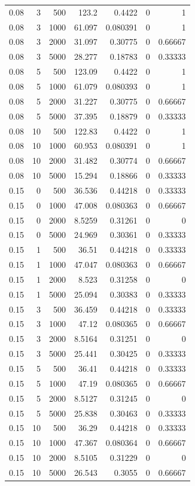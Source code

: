 \begin{tabular}{rrrrrrr}
0.08 & 3 & 500 & 123.2 & 0.4422 & 0 & 1 \\
0.08 & 3 & 1000 & 61.097 & 0.080391 & 0 & 1 \\
0.08 & 3 & 2000 & 31.097 & 0.30775 & 0 & 0.66667 \\
0.08 & 3 & 5000 & 28.277 & 0.18783 & 0 & 0.33333 \\
0.08 & 5 & 500 & 123.09 & 0.4422 & 0 & 1 \\
0.08 & 5 & 1000 & 61.079 & 0.080393 & 0 & 1 \\
0.08 & 5 & 2000 & 31.227 & 0.30775 & 0 & 0.66667 \\
0.08 & 5 & 5000 & 37.395 & 0.18879 & 0 & 0.33333 \\
0.08 & 10 & 500 & 122.83 & 0.4422 & 0 & 1 \\
0.08 & 10 & 1000 & 60.953 & 0.080391 & 0 & 1 \\
0.08 & 10 & 2000 & 31.482 & 0.30774 & 0 & 0.66667 \\
0.08 & 10 & 5000 & 15.294 & 0.18866 & 0 & 0.33333 \\
0.15 & 0 & 500 & 36.536 & 0.44218 & 0 & 0.33333 \\
0.15 & 0 & 1000 & 47.008 & 0.080363 & 0 & 0.66667 \\
0.15 & 0 & 2000 & 8.5259 & 0.31261 & 0 & 0 \\
0.15 & 0 & 5000 & 24.969 & 0.30361 & 0 & 0.33333 \\
0.15 & 1 & 500 & 36.51 & 0.44218 & 0 & 0.33333 \\
0.15 & 1 & 1000 & 47.047 & 0.080363 & 0 & 0.66667 \\
0.15 & 1 & 2000 & 8.523 & 0.31258 & 0 & 0 \\
0.15 & 1 & 5000 & 25.094 & 0.30383 & 0 & 0.33333 \\
0.15 & 3 & 500 & 36.459 & 0.44218 & 0 & 0.33333 \\
0.15 & 3 & 1000 & 47.12 & 0.080365 & 0 & 0.66667 \\
0.15 & 3 & 2000 & 8.5164 & 0.31251 & 0 & 0 \\
0.15 & 3 & 5000 & 25.441 & 0.30425 & 0 & 0.33333 \\
0.15 & 5 & 500 & 36.41 & 0.44218 & 0 & 0.33333 \\
0.15 & 5 & 1000 & 47.19 & 0.080365 & 0 & 0.66667 \\
0.15 & 5 & 2000 & 8.5127 & 0.31245 & 0 & 0 \\
0.15 & 5 & 5000 & 25.838 & 0.30463 & 0 & 0.33333 \\
0.15 & 10 & 500 & 36.29 & 0.44218 & 0 & 0.33333 \\
0.15 & 10 & 1000 & 47.367 & 0.080364 & 0 & 0.66667 \\
0.15 & 10 & 2000 & 8.5105 & 0.31229 & 0 & 0 \\
0.15 & 10 & 5000 & 26.543 & 0.3055 & 0 & 0.66667 \\
\bottomrule
\end{tabular}
